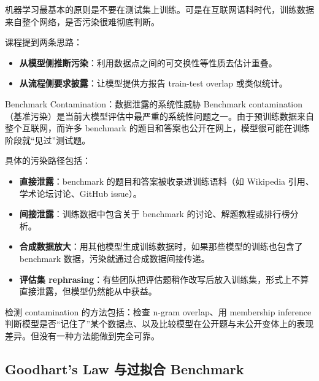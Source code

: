\documentclass[a4paper]{article}
\begin{document}
机器学习最基本的原则是不要在测试集上训练。可是在互联网语料时代，训练数据来自整个网络，是否污染很难彻底判断。

课程提到两条思路：

\begin{itemize}
    \item \textbf{从模型侧推断污染}：利用数据点之间的可交换性等性质去估计重叠。
    \item \textbf{从流程侧要求披露}：让模型提供方报告 train-test overlap 或类似统计。
\end{itemize}

\begin{warningbox}{Benchmark Contamination：数据泄露的系统性威胁}
Benchmark contamination（基准污染）是当前大模型评估中最严重的系统性问题之一。由于预训练数据来自整个互联网，而许多 benchmark 的题目和答案也公开在网上，模型很可能在训练阶段就``见过''测试题。

具体的污染路径包括：
\begin{itemize}
    \item \textbf{直接泄露}：benchmark 的题目和答案被收录进训练语料（如 Wikipedia 引用、学术论坛讨论、GitHub issue）。
    \item \textbf{间接泄露}：训练数据中包含关于 benchmark 的讨论、解题教程或排行榜分析。
    \item \textbf{合成数据放大}：用其他模型生成训练数据时，如果那些模型的训练也包含了 benchmark 数据，污染就通过合成数据间接传递。
    \item \textbf{评估集 rephrasing}：有些团队把评估题稍作改写后放入训练集，形式上不算直接泄露，但模型仍然能从中获益。
\end{itemize}

检测 contamination 的方法包括：检查 n-gram overlap、用 membership inference 判断模型是否``记住了''某个数据点、以及比较模型在公开题与未公开变体上的表现差异。但没有一种方法能做到完全可靠。
\end{warningbox}

\subsection{Goodhart's Law 与过拟合 Benchmark}
\end{document}
